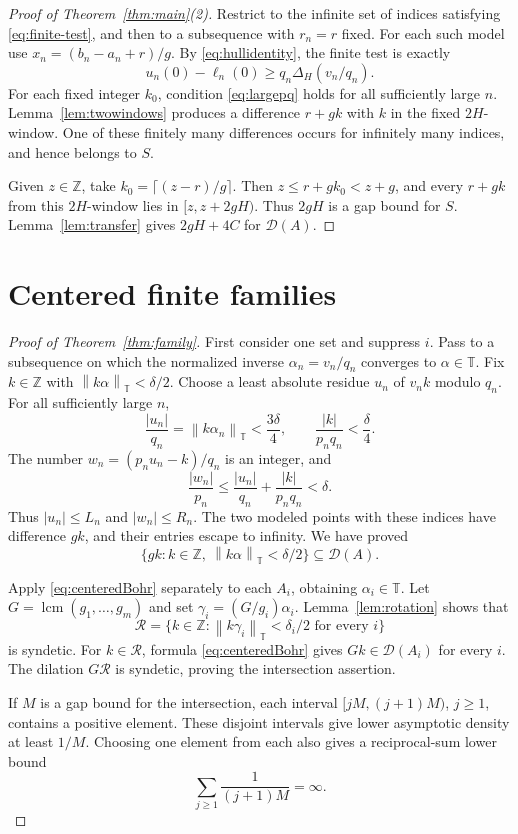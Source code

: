 \documentclass[11pt,leqno]{amsart}
\numberwithin{equation}{section}
\theoremstyle{definition}
\theoremstyle{remark}
\newcommand{\Z}{\mathbb Z}
\newcommand{\T}{\mathbb T}
\newcommand{\D}{\mathcal D}
\newcommand{\normt}[1]{\left\|#1\right\|_{\T}}
\newcommand{\gap}{\Delta}
\begin{document}
\begin{proof}[Proof of Theorem~\ref{thm:main}(2)]
Restrict to the infinite set of indices satisfying \eqref{eq:finite-test}, and then to a subsequence with $r_n=r$ fixed. For each such model use $x_n=(b_n-a_n+r)/g$. By \eqref{eq:hullidentity}, the finite test is exactly
\[
u_n(0)-\ell_n(0)\ge q_n\gap_H(v_n/q_n).
\]
For each fixed integer $k_0$, condition \eqref{eq:largepq} holds for all sufficiently large $n$. Lemma~\ref{lem:twowindows} produces a difference $r+gk$ with $k$ in the fixed $2H$-window. One of these finitely many differences occurs for infinitely many indices, and hence belongs to $S$.

Given $z\in\Z$, take $k_0=\lceil(z-r)/g\rceil$. Then
$z\le r+gk_0<z+g$, and every $r+gk$ from this $2H$-window lies in $[z,z+2gH)$. Thus $2gH$ is a gap bound for $S$. Lemma~\ref{lem:transfer} gives $2gH+4C$ for $\D(A)$.
\end{proof}

\section{Centered finite families}

\begin{proof}[Proof of Theorem~\ref{thm:family}]
First consider one set and suppress $i$. Pass to a subsequence on which the normalized inverse $\alpha_n=v_n/q_n$ converges to $\alpha\in\T$. Fix $k\in\Z$ with $\normt{k\alpha}<\delta/2$. Choose a least absolute residue $u_n$ of $v_nk$ modulo $q_n$. For all sufficiently large $n$,
\[
\frac{|u_n|}{q_n}=\normt{k\alpha_n}<\frac{3\delta}{4},
\qquad \frac{|k|}{p_nq_n}<\frac\delta4.
\]
The number $w_n=(p_nu_n-k)/q_n$ is an integer, and
\[
\frac{|w_n|}{p_n}\le\frac{|u_n|}{q_n}+\frac{|k|}{p_nq_n}<\delta.
\]
Thus $|u_n|\le L_n$ and $|w_n|\le R_n$. The two modeled points with these indices have difference $gk$, and their entries escape to infinity. We have proved
\begin{equation}\label{eq:centeredBohr}
\{gk:k\in\Z,\ \normt{k\alpha}<\delta/2\}\subseteq\D(A).
\end{equation}

Apply \eqref{eq:centeredBohr} separately to each $A_i$, obtaining $\alpha_i\in\T$. Let $G=\operatorname{lcm}(g_1,\ldots,g_m)$ and set $\gamma_i=(G/g_i)\alpha_i$. Lemma~\ref{lem:rotation} shows that
\[
\mathcal R=\{k\in\Z:\normt{k\gamma_i}<\delta_i/2\text{ for every }i\}
\]
is syndetic. For $k\in\mathcal R$, formula \eqref{eq:centeredBohr} gives $Gk\in\D(A_i)$ for every $i$. The dilation $G\mathcal R$ is syndetic, proving the intersection assertion.

If $M$ is a gap bound for the intersection, each interval $[jM,(j+1)M)$, $j\ge1$, contains a positive element. These disjoint intervals give lower asymptotic density at least $1/M$. Choosing one element from each also gives a reciprocal-sum lower bound
\[
\sum_{j\ge1}\frac1{(j+1)M}=\infty.
\]
\end{proof}
\end{document}
